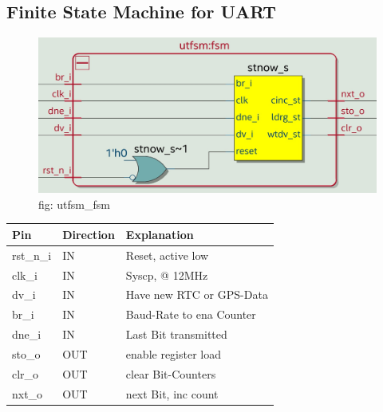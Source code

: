 \documentclass[12pt,a4 paper] {article}
\begin{document}
\newpage

\subsection{Finite State Machine for UART}
\begin{figure}[h]
	\centering	
	\includegraphics[scale=0.2]{../png/utfsm_fsm.png}
	\newline
	fig: utfsm\_fsm\\
\end{figure}

\begin{center}
	\begin{tabular}{| p{2cm} | p{2cm} | p{4cm} |}
		\hline
		Pin & Direction  & Explanation\\
		\hline	
		rst\_n\_i & IN  & Reset, active low\\
		\hline
		clk\_i   & IN  & Syscp, @ 12MHz \\
		\hline
		dv\_i    & IN  & Have new RTC or GPS-Data\\
		\hline
		br\_i    & IN  & Baud-Rate to ena Counter\\
		\hline
		dne\_i   & IN  &  Last Bit transmitted\\
		\hline
		sto\_o   & OUT & enable register load\\
		\hline
		clr\_o   & OUT & clear Bit-Counters\\
		\hline
		nxt\_o   & OUT & next Bit, inc count\\
		\hline
		
	\end{tabular}
\end{center}
\newpage
\end{document}
